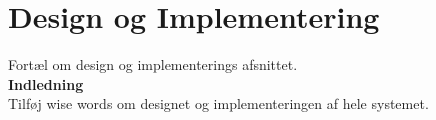 \section{Design og Implementering}

Fortæl om design og implementerings afsnittet. \\

\textbf{Indledning} \\

Tilføj wise words om designet og implementeringen af hele systemet.





